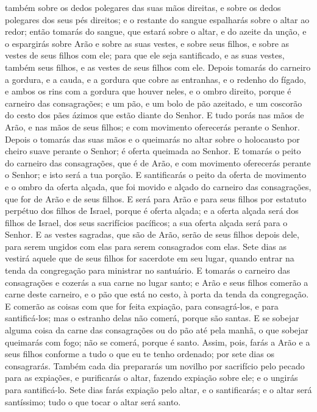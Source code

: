 também sobre os dedos polegares das suas mãos direitas, e sobre os
dedos polegares dos seus pés direitos; e o restante do sangue
espalharás sobre o altar ao redor; então tomarás do sangue,
que estará sobre o altar, e do azeite da unção, e o espargirás sobre
Arão e sobre as suas vestes, e sobre seus filhos, e sobre as vestes
de seus filhos com ele; para que ele seja santificado, e as suas
vestes, também seus filhos, e as vestes de seus filhos com ele.
Depois tomarás do carneiro a gordura, e a cauda, e a gordura
que cobre as entranhas, e o redenho do fígado, e ambos os rins com a
gordura que houver neles, e o ombro direito, porque é carneiro das
consagrações; e um pão, e um bolo de pão azeitado, e um
coscorão do cesto dos pães ázimos que estão diante do Senhor.
E tudo porás nas mãos de Arão, e nas mãos de seus filhos; e
com movimento oferecerás perante o Senhor. Depois o tomarás
das suas mãos e o queimarás no altar sobre o holocausto por cheiro
suave perante o Senhor; é oferta queimada ao Senhor. E
tomarás o peito do carneiro das consagrações, que é de Arão, e com
movimento oferecerás perante o Senhor; e isto será a tua porção.
E santificarás o peito da oferta de movimento e o ombro da
oferta alçada, que foi movido e alçado do carneiro das consagrações,
que for de Arão e de seus filhos. E será para Arão e para
seus filhos por estatuto perpétuo dos filhos de Israel, porque é
oferta alçada; e a oferta alçada será dos filhos de Israel, dos seus
sacrifícios pacíficos; a sua oferta alçada será para o Senhor.
E as vestes sagradas, que são de Arão, serão de seus filhos
depois dele, para serem ungidos com elas para serem consagrados com
elas. Sete dias as vestirá aquele que de seus filhos for
sacerdote em seu lugar, quando entrar na tenda da congregação para
ministrar no santuário. E tomarás o carneiro das consagrações
e cozerás a sua carne no lugar santo; e Arão e seus filhos
comerão a carne deste carneiro, e o pão que está no cesto, à porta
da tenda da congregação. E comerão as coisas com que for
feita expiação, para consagrá-los, e para santificá-los; mas o
estranho delas não comerá, porque são santas. E se sobejar
alguma coisa da carne das consagrações ou do pão até pela manhã, o
que sobejar queimarás com fogo; não se comerá, porque é santo.
Assim, pois, farás a Arão e a seus filhos conforme a tudo o
que eu te tenho ordenado; por sete dias os consagrarás.
Também cada dia prepararás um novilho por sacrifício pelo
pecado para as expiações, e purificarás o altar, fazendo expiação
sobre ele; e o ungirás para santificá-lo. Sete dias farás
expiação pelo altar, e o santificarás; e o altar será santíssimo;
tudo o que tocar o altar será santo.

